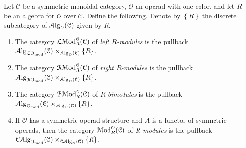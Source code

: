 \begin{definition}\label{1.4.8}
	Let $\mathcal{C} $ be a symmetric monoidal category, $\mathcal{O} $ an operad with one color, and let $R$ be an algebra for $\mathcal{O} $ over $\mathcal{C} $. Define the following. Denote by $\left\{ R \right\} $ the discrete subcategory of $\mathcal{A}\mathrm{lg}_\mathcal{O} (\mathcal{C} )$ given by $R$.
	\begin{enumerate}[label=(\arabic*), align=left]
		\item The category $\mathcal{L}\mathcal{M}\mathrm{od}_R^\mathcal{O} (\mathcal{C} )$ of \emph{left $R$-modules} is the pullback $\mathcal{A}\mathrm{lg}_{\mathcal{L} \mathcal{O} _{\mathrm{mod} } } (\mathcal{C} )\times_{\mathcal{A}\mathrm{lg}_\mathcal{O} (\mathcal{C} )} \left\{ R \right\} $.
		\item The category $\mathcal{R}\mathcal{M}\mathrm{od}_R^\mathcal{O} (\mathcal{C} )$ of \emph{right $R$-modules} is the pullback $\mathcal{A}\mathrm{lg}_{\mathcal{R} \mathcal{O} _{\mathrm{mod} } } (\mathcal{C} )\times_{\mathcal{A}\mathrm{lg}_\mathcal{O} (\mathcal{C} )} \left\{ R \right\} $.
		\item The category $\mathcal{B}\mathcal{M}\mathrm{od}_R^\mathcal{O} (\mathcal{C} )$ of \emph{$R$-bimodules} is the pullback $\mathcal{A}\mathrm{lg}_{\mathcal{O} _{\mathrm{mod} } } (\mathcal{C} )\times_{\mathcal{A}\mathrm{lg}_\mathcal{O} (\mathcal{C} )} \left\{ R \right\} $.
		\item If $\mathcal{O} $ has a symmetric operad structure and $A$ is a functor of symmetric operads, then the category $\mathcal{M}\mathrm{od}_R^\mathcal{O} (\mathcal{C} )$ of \emph{$R$-modules} is the pullback $\mathcal{C}\mathcal{A}\mathrm{lg}_{\mathcal{O} _{\mathrm{mod} } } (\mathcal{C} )\times_{\mathcal{C}\mathcal{A}\mathrm{lg}_\mathcal{O} (\mathcal{C} )} \left\{ R \right\} $.
	\end{enumerate}
\end{definition}

